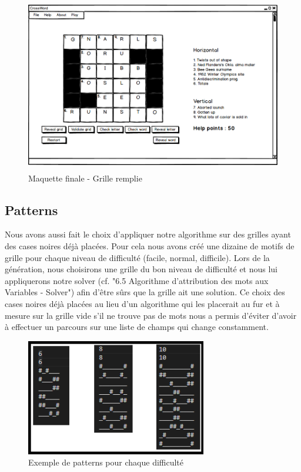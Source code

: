 \documentclass [ 11 pt ] {article}
\begin{document}
        \begin{figure}[H]
        \begin{center}
        \includegraphics[height=3in]{Maquettes/finales/Grille_remplie.png}
        \caption{Maquette finale - Grille remplie} 
        \end{center}
        \end{figure}
    \subsection{Patterns}
        Nous avons aussi fait le choix d'appliquer notre algorithme sur des grilles ayant des cases noires déjà placées. Pour cela nous avons créé une dizaine de motifs de grille pour chaque niveau de difficulté (facile, normal, difficile). Lors de la génération, nous choisirons une grille du bon niveau de difficulté et nous lui appliquerons notre solver (cf. "6.5 Algorithme d'attribution des mots aux Variables - Solver") afin d'être sûrs que la grille ait une solution. Ce choix des cases noires déjà placées au lieu d'un algorithme qui les placerait au fur et à mesure sur la grille vide s'il ne trouve pas de mots nous a permis d'éviter d'avoir à effectuer un parcours sur une liste de champs qui change constamment. 
        
        \begin{figure}[H]
            \begin{center}
            \includegraphics[height=2in]{patterns.png}
            \caption{Exemple de patterns pour chaque difficulté} 
            \end{center}
            \end{figure}
    
\end{document}
